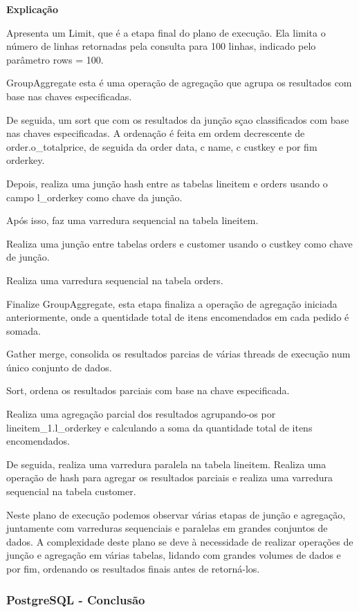 \documentclass{article}
\begin{document}
\begin{lstlisting}[language=SQL]
\end{lstlisting}

\textbf{Explicação}\\
\texttt{}\par Apresenta um Limit, que é a etapa final do plano de execução. Ela limita o número de linhas retornadas pela consulta para 100 linhas, indicado pelo parâmetro rows = 100.

GroupAggregate esta é uma operação de agregação que agrupa os resultados com base nas chaves especificadas.

De seguida, um sort que com os resultados da junção sçao classificados com base nas chaves especificadas. A ordenação é feita em ordem decrescente de order.o\_totalprice, de seguida da order data, c name, c custkey e por fim orderkey.

Depois, realiza uma junção hash entre as tabelas lineitem e orders usando o campo l\_orderkey como chave da junção.

Após isso, faz uma varredura sequencial na tabela lineitem.

Realiza uma junção entre tabelas orders e customer usando o custkey como chave de junção.

Realiza uma varredura sequencial na tabela orders.

Finalize GroupAggregate, esta etapa finaliza a operação de agregação iniciada anteriormente, onde a quentidade total de itens encomendados em cada pedido é somada.

Gather merge, consolida os resultados parcias de várias threads de execução num único conjunto de dados.

Sort, ordena os resultados parciais com base na chave especificada.

Realiza uma agregação parcial dos resultados agrupando-os por lineitem\_1.l\_orderkey e calculando a soma da quantidade total de itens encomendados.

De seguida, realiza uma varredura paralela na tabela lineitem. Realiza uma operação de hash para agregar os resultados parciais e realiza uma varredura sequencial na tabela customer.

Neste plano de execução podemos observar várias etapas de junção e agregação, juntamente com varreduras sequenciais e paralelas em grandes conjuntos de dados. A complexidade deste plano se deve à necessidade de realizar operações de junção e agregação em várias tabelas, lidando com grandes volumes de dados e por fim, ordenando os resultados finais antes de retorná-los.
\subsubsection{PostgreSQL - Conclusão}
\end{document}
